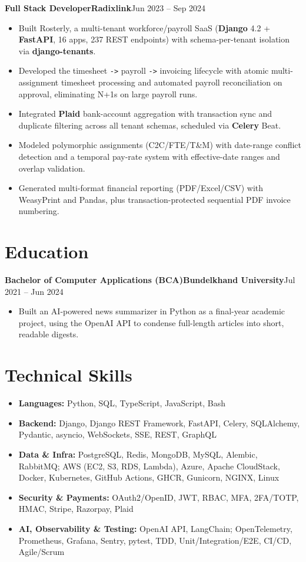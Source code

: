 \documentclass[11pt,a4paper]{article}
\newcommand{\entry}[3]{%
  \vspace{4.5pt}\noindent\textbf{#1}\hfill\textbf{#2}\hfill{\color{subtlegray}#3}\par\vspace{2pt}}
\begin{document}
\entry{Full Stack Developer}{Radixlink}{Jun 2023 -- Sep 2024}
\begin{itemize}
  \item Built Rosterly, a multi-tenant workforce/payroll SaaS (\textbf{Django} 4.2
        + \textbf{FastAPI}, 16 apps, 237 REST endpoints) with schema-per-tenant
        isolation via \textbf{django-tenants}.
  \item Developed the timesheet \texttt{->} payroll \texttt{->} invoicing
        lifecycle with atomic multi-assignment timesheet processing and automated
        payroll reconciliation on approval, eliminating N+1s on large payroll runs.
  \item Integrated \textbf{Plaid} bank-account aggregation with transaction sync
        and duplicate filtering across all tenant schemas, scheduled via
        \textbf{Celery} Beat.
  \item Modeled polymorphic assignments (C2C/FTE/T\&M) with date-range conflict
        detection and a temporal pay-rate system with effective-date ranges and
        overlap validation.
  \item Generated multi-format financial reporting (PDF/Excel/CSV) with WeasyPrint
        and Pandas, plus transaction-protected sequential PDF invoice numbering.
\end{itemize}

\section{Education}
\entry{Bachelor of Computer Applications (BCA)}{Bundelkhand University}{Jul 2021 -- Jun 2024}
\begin{itemize}
  \item Built an AI-powered news summarizer in Python as a final-year academic
        project, using the OpenAI API to condense full-length articles into short,
        readable digests.
\end{itemize}

\section{Technical Skills}
\begin{itemize}
  \item \textbf{Languages:} Python, SQL, TypeScript, JavaScript, Bash
  \item \textbf{Backend:} Django, Django REST Framework, FastAPI, Celery,
        SQLAlchemy, Pydantic, asyncio, WebSockets, SSE, REST, GraphQL
  \item \textbf{Data \& Infra:} PostgreSQL, Redis, MongoDB, MySQL, Alembic,
        RabbitMQ; AWS (EC2, S3, RDS, Lambda), Azure, Apache CloudStack, Docker,
        Kubernetes, GitHub Actions, GHCR, Gunicorn, NGINX, Linux
  \item \textbf{Security \& Payments:} OAuth2/OpenID, JWT, RBAC, MFA, 2FA/TOTP,
        HMAC, Stripe, Razorpay, Plaid
  \item \textbf{AI, Observability \& Testing:} OpenAI API, LangChain;
        OpenTelemetry, Prometheus,
        Grafana, Sentry, pytest, TDD, Unit/Integration/E2E, CI/CD, Agile/Scrum
\end{itemize}
\end{document}
